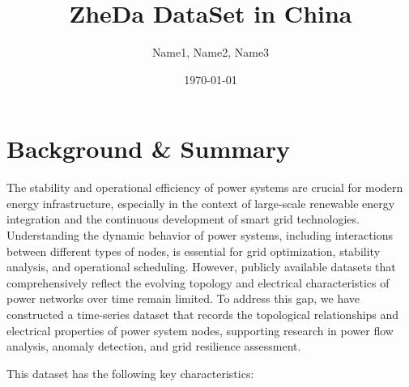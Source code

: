 \documentclass[12pt]{article}
\title{ZheDa DataSet in China}
\author{Name1, Name2, Name3}
\date{\today}
\begin{document}
\maketitle

\begin{abstract}
    
\end{abstract}

\section*{Background \& Summary}

The stability and operational efficiency of power systems are crucial for modern energy infrastructure,
especially in the context of large-scale renewable energy integration and the continuous development of smart grid technologies.
Understanding the dynamic behavior of power systems, including interactions between different types of nodes, is essential for grid optimization,
stability analysis, and operational scheduling. However, publicly available datasets that comprehensively reflect the evolving topology and electrical
characteristics of power networks over time remain limited. To address this gap, we have constructed a time-series dataset that records the topological
relationships and electrical properties of power system nodes, supporting research in power flow analysis, anomaly detection, and grid resilience assessment.  

This dataset has the following key characteristics:
\end{document}
